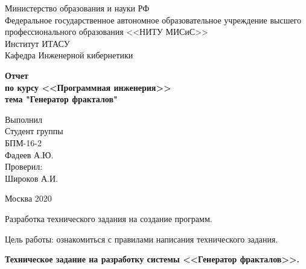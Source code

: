 \documentclass[a4paper,12pt,preview]{report} %
\begin{document}
	
	\begin{center}
		Министерство образования и науки РФ \\
		Федеральное государственное автономное образовательное учреждение высшего профессионального образования <<НИТУ МИСиС>>\\
		Институт ИТАСУ\\
		Кафедра Инженерной кибернетики\\
	\end{center}
	
	
	\vfill
	
	\begin{center}
		\Large\textbf{Отчет  \\
			по курсу <<Программная инженерия>>\\
			тема "Генератор фракталов"}
	\end{center}
	
	\vfill
	
	\begin{FlushRight}
		Выполнил\\
		Студент группы \\
		БПМ-16-2 \\
		Фадеев А.Ю. \\
		[\baselineskip]
		Проверил: \\
		Широков А.И. \\
		[9\baselineskip]
	\end{FlushRight}
	
	
	\begin{center}
		Москва 2020
	\end{center}
	
	\thispagestyle{empty}
	\newpage
	
	
	Разработка технического задания на создание программ.
	
	Цель работы: ознакомиться с правилами написания технического задания.
	
	
	\begin{center}
		\textbf{Техническое задание на разработку системы <<Генератор фракталов>>.}
	\end{center}
	
\end{document}
